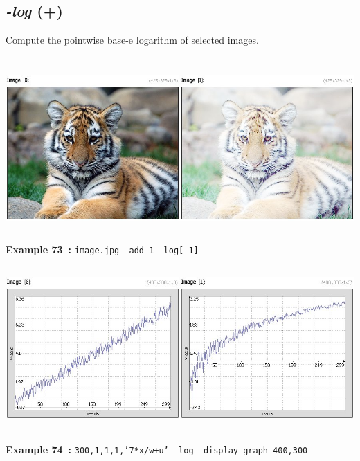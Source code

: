 \documentclass[a4paper,11pt,twoside]{book}
\begin{document}
\subsection{\emph{-log} (+)}\vspace*{-0.5em}
Compute the pointwise base-e logarithm of selected images.
\begin{center}\includegraphics[keepaspectratio=true,height=7cm,width=\textwidth]{img/gmic_def73.jpg}\\
{\footnotesize \textbf{Example 73~:} \texttt{image.jpg --add 1 -log[-1]}}
\\\includegraphics[keepaspectratio=true,height=7cm,width=\textwidth]{img/gmic_def74.jpg}\\
{\footnotesize \textbf{Example 74~:} \texttt{300,1,1,1,'7*x/w+u' --log -display\_graph 400,300}}
\end{center}
\end{document}
